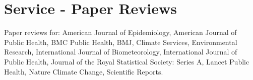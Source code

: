 \section*{Service - Paper Reviews}

\noindent Paper reviews for: American Journal of Epidemiology, American Journal of Public Health, BMC Public Health, BMJ, Climate Services, Environmental Research, International Journal of Biometeorology, International Journal of Public Health, Journal of the Royal Statistical Society: Series A, Lancet Public Health, Nature Climate Change, Scientific Reports.

